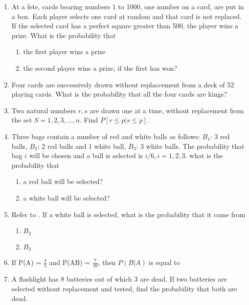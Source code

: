 \begin{enumerate}[label=\thesubsection.\arabic*,ref=\thesubsection.\theenumi]
\\
\solution 

\item At a fete, cards bearing numbers 1 to 1000, one number on a card, are put in a box. Each player selects one card at random and that card is not replaced. If the selected card has a perfect square greater than 500, the player wins a prize. What is the probability that 
\begin{enumerate}
\item the first player wins a prize
\item the second player wins a prize, if the first has won?
\end{enumerate}
\solution

\item Four cards are successively drawn without replaccement from a deck of 52 playing cards. What is the probability that all the four cards are kings?
\\
\solution

\item Two natural numbers $r, s$ are drawn one at a time, without replacement from
the set $S = {1,2,3, \ldots,n}$. Find $P[r\le p|s\le p]$.
\\
\solution 

\item Three bags contain a number of red and white balls as follows:
$B_1$: 3 red balls, $B_2$: 2 red balls and 1 white ball, $B_3$: 3 white balls.
The probability that bag $i$ will be chosen and a ball is selected is $i/6, i=1,2,3$.
what is the probability that
\label{prob:12/13/3/41}
\begin{enumerate}
	\item a red ball will be selected?     
	\item  a white ball will be selected?
\end{enumerate}
\solution

%
\item Refer to . If a white ball is selected, what is the probability that it came from
\begin{enumerate}
\item  $B_2$
\item  $B_3$
\end{enumerate}
\solution
%
\item If P(A) = $\frac{4}{5}$ and P(AB) = $\frac{7}{10}$, then $P(B|A)$ is equal to\\
\solution
%
\item A flashlight has 8 batteries out of which 3 are dead. If two batteries are selected without replacement and tested, find the probability that both are dead.\\

\end{enumerate}
